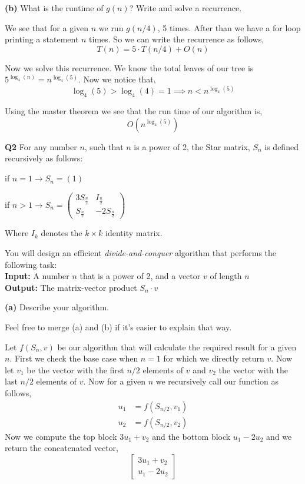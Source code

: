 \documentclass[12pt]{article}
\newcommand{\question}[3][Q]{
\begin{description}
\item \textbf{#1{#2}} #3
\end{description}
}
\newcommand{\note}[1]{{\footnotesize
    \begin{description}
    [leftmargin=3.4em,style=nextline]
        \item[Note:] {#1}
    \end{description}}   
}
\begin{document}
\question[]{(b)}{
    What is the runtime of $g(n)$? Write and solve a recurrence. 
}
\begin{answer}
    We see that for a given $n$ we run $g( n/ 4)$, 5 times. After than we have a for loop printing a statement $n$ times. So we can write the recurrence as follows, 
    $$  T(n) = 5 \cdot T(n /4) + O(n) $$ 

    Now we solve this recurrence. We know the total leaves of our tree is $5^{\log_4(n)} = n^{\log_4(5)}$. Now we notice that, 
    $$ \log_4(5) > \log_4(4) = 1 \implies n < n^{\log_4(5)} $$

    Using the master theorem we see that the run time of our algorithm is, 
    $$ O(n^{\log_4(5)}) $$ 
\end{answer}
\newpage 
\question{2}{
    For any number $n$, such that $n$ is a power of 2, the Star matrix, $S_n$ is defined recursively as follows:

    if $n = 1 \to S_n = (1)$

    if $n > 1 \to S_n = \begin{pmatrix} 
    3S_{\frac{n}{2}} & I_{\frac{n}{2}} \\
    S_{\frac{n}{2}} & -2S_{\frac{n}{2}}
    \end{pmatrix}$

    Where $I_k$ denotes the $k \times k$ identity matrix.

    You will design an efficient \textit{divide-and-conquer} algorithm that performs the following task:\\

    \textbf{Input:} A number $n$ that is a power of 2, and a vector $v$ of length $n$ \\
    \textbf{Output:} The matrix-vector product $S_n \cdot v$
}

\question[]{(a)}{
    Describe your algorithm.
    \note{Feel free to merge (a) and (b) if it's easier to explain that way.}
}
\begin{answer}
     Let $f(S_n, v)$ be our algorithm that will calculate the required result for a given $n$. First we check the base case when $n = 1$ for which we directly return $v$. Now let $v_1$ be the vector with the first $n /2$ elements of $v$ and $v_2$ the vector with the last $n /2$ elements of $v$. Now for a given $n$ we recursively call our function as follows,  
     \begin{align*}
         u_1 &= f(S_{n /2}, v_1)\\
         u_2 &= f(S_{n /2}, v_2)
     \end{align*}
     Now we compute the top block $3u_1 + v_2$ and the bottom block $u_1 - 2u_2$ and we return the concatenated vector, 
     $$ \begin{bmatrix} 3u_1 + v_2 \\ u_1 - 2u_2 \end{bmatrix} $$ 
\end{answer}
\end{document}
